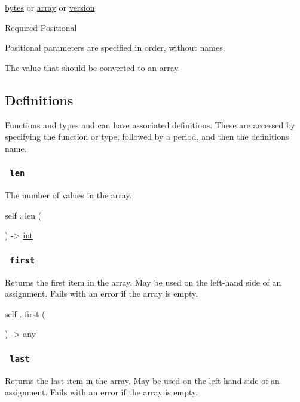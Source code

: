 \href{/docs/reference/foundations/bytes/}{bytes} {or}
\href{/docs/reference/foundations/array/}{array} {or}
\href{/docs/reference/foundations/version/}{version}

{Required} {{ Positional }}

\label{constructor-value-positional-tooltip}
Positional parameters are specified in order, without names.

The value that should be converted to an array.

\subsection{\texorpdfstring{{ Definitions
}}{ Definitions }}\label{definitions}

\label{definitions-tooltip}
Functions and types and can have associated definitions. These are
accessed by specifying the function or type, followed by a period, and
then the definition\textquotesingle s name.

\subsubsection{\texorpdfstring{\texttt{\ len\ }}{ len }}\label{definitions-len}

The number of values in the array.

self { . } { len } (

) -\textgreater{} \href{/docs/reference/foundations/int/}{int}

\subsubsection{\texorpdfstring{\texttt{\ first\ }}{ first }}\label{definitions-first}

Returns the first item in the array. May be used on the left-hand side
of an assignment. Fails with an error if the array is empty.

self { . } { first } (

) -\textgreater{} { any }

\subsubsection{\texorpdfstring{\texttt{\ last\ }}{ last }}\label{definitions-last}

Returns the last item in the array. May be used on the left-hand side of
an assignment. Fails with an error if the array is empty.

